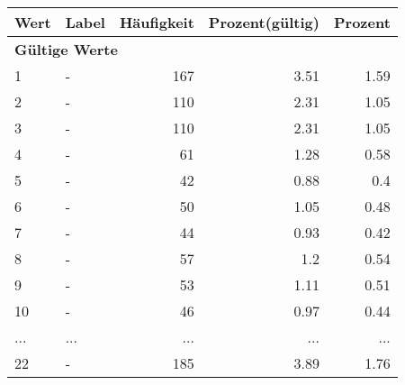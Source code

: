      \begin{longtable}{lXrrr}
     \toprule
     \textbf{Wert} & \textbf{Label} & \textbf{Häufigkeit} & \textbf{Prozent(gültig)} & \textbf{Prozent} \\
     \endhead
     \midrule
     \multicolumn{5}{l}{\textbf{Gültige Werte}}\\
        1 & \multicolumn{1}{X}{-} & %
          \num{167} &
          \num[round-mode=places,round-precision=2]{3.51} &
          \num[round-mode=places,round-precision=2]{1.59} \\
        2 & \multicolumn{1}{X}{-} & %
          \num{110} &
          \num[round-mode=places,round-precision=2]{2.31} &
          \num[round-mode=places,round-precision=2]{1.05} \\
        3 & \multicolumn{1}{X}{-} & %
          \num{110} &
          \num[round-mode=places,round-precision=2]{2.31} &
          \num[round-mode=places,round-precision=2]{1.05} \\
        4 & \multicolumn{1}{X}{-} & %
          \num{61} &
          \num[round-mode=places,round-precision=2]{1.28} &
          \num[round-mode=places,round-precision=2]{0.58} \\
        5 & \multicolumn{1}{X}{-} & %
          \num{42} &
          \num[round-mode=places,round-precision=2]{0.88} &
          \num[round-mode=places,round-precision=2]{0.4} \\
        6 & \multicolumn{1}{X}{-} & %
          \num{50} &
          \num[round-mode=places,round-precision=2]{1.05} &
          \num[round-mode=places,round-precision=2]{0.48} \\
        7 & \multicolumn{1}{X}{-} & %
          \num{44} &
          \num[round-mode=places,round-precision=2]{0.93} &
          \num[round-mode=places,round-precision=2]{0.42} \\
        8 & \multicolumn{1}{X}{-} & %
          \num{57} &
          \num[round-mode=places,round-precision=2]{1.2} &
          \num[round-mode=places,round-precision=2]{0.54} \\
        9 & \multicolumn{1}{X}{-} & %
          \num{53} &
          \num[round-mode=places,round-precision=2]{1.11} &
          \num[round-mode=places,round-precision=2]{0.51} \\
        10 & \multicolumn{1}{X}{-} & %
          \num{46} &
          \num[round-mode=places,round-precision=2]{0.97} &
          \num[round-mode=places,round-precision=2]{0.44} \\
       ... & ... & ... & ... & ... \\
        22 & \multicolumn{1}{X}{-} & %
          \num{185} &
          \num[round-mode=places,round-precision=2]{3.89} &
          \num[round-mode=places,round-precision=2]{1.76} \\


\end{longtable}
